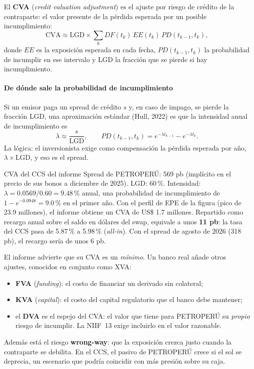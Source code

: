 \begin{definicion}[CVA]
El \textbf{CVA} (\emph{credit valuation adjustment}) es el ajuste por riesgo de crédito de la contraparte: el valor presente de la pérdida esperada por un posible incumplimiento:
\[ \text{CVA}\approx\text{LGD}\times\sum_{k}DF(t_k)\,EE(t_k)\,PD(t_{k-1},t_k), \]
donde $EE$ es la exposición esperada en cada fecha, $PD(t_{k-1},t_k)$ la probabilidad de incumplir en ese intervalo y LGD la fracción que se pierde si hay incumplimiento.
\end{definicion}

\paragraph{De dónde sale la probabilidad de incumplimiento} Si un emisor paga un spread de crédito $s$ y, en caso de impago, se pierde la fracción LGD, una aproximación estándar (Hull, 2022) es que la intensidad anual de incumplimiento es
\[ \lambda\approx\frac{s}{\text{LGD}},\qquad PD(t_{k-1},t_k)=e^{-\lambda t_{k-1}}-e^{-\lambda t_k}. \]
La lógica: el inversionista exige como compensación la pérdida esperada por año, $\lambda\times\text{LGD}$, y eso es el spread.

\begin{ejemplo}{CVA del CCS del informe}
Spread de PETROPERÚ: 569 pb (implícito en el precio de sus bonos a diciembre de 2025). LGD: 60\,\%. Intensidad: $\lambda=0.0569/0.60=9.48\,\%$ anual, una probabilidad de incumplimiento de $1-e^{-0.0948}=9.0\,\%$ en el primer año. Con el perfil de EPE de la figura (pico de 23.9 millones), el informe obtiene un CVA de US\$ 1.7 millones. Repartido como recargo anual sobre el saldo en dólares del swap, equivale a unos \textbf{11 pb}: la tasa del CCS pasa de 5.87\,\% a 5.98\,\% (\emph{all-in}). Con el spread de agosto de 2026 (318 pb), el recargo sería de unos 6 pb.
\end{ejemplo}

\begin{adicional}
El informe advierte que su CVA es un \emph{mínimo}. Un banco real añade otros ajustes, conocidos en conjunto como XVA:
\begin{itemize}
\item \textbf{FVA} (\emph{funding}): el costo de financiar un derivado sin colateral;
\item \textbf{KVA} (\emph{capital}): el costo del capital regulatorio que el banco debe mantener;
\item el \textbf{DVA} es el espejo del CVA: el valor que tiene para PETROPERÚ su \emph{propio} riesgo de incumplir. La NIIF~13 exige incluirlo en el valor razonable.
\end{itemize}
Además está el riesgo \textbf{wrong-way}: que la exposición crezca justo cuando la contraparte se debilita. En el CCS, el pasivo de PETROPERÚ crece si el sol se deprecia, un escenario que podría coincidir con más presión sobre su caja.
\end{adicional}

